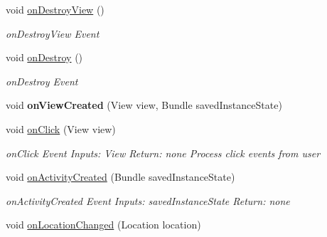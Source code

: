 \begin{DoxyCompactItemize}
void \hyperlink{classedu_1_1tamu_1_1rfsignalmap_1_1_main_activity_fragment_a8fc6bd0e569bf3c9a160a22a00d6eb06}{on\+Destroy\+View} ()
\begin{DoxyCompactList}\small\item\em on\+Destroy\+View Event \end{DoxyCompactList}\item 
void \hyperlink{classedu_1_1tamu_1_1rfsignalmap_1_1_main_activity_fragment_ac3f59b7c8c8f3f7547d7d7d1076a75ff}{on\+Destroy} ()
\begin{DoxyCompactList}\small\item\em on\+Destroy Event \end{DoxyCompactList}\item 
void {\bfseries on\+View\+Created} (View view, Bundle saved\+Instance\+State)\hypertarget{classedu_1_1tamu_1_1rfsignalmap_1_1_main_activity_fragment_acffa94c825f2858ede8ea7dd31f3c60e}{}\label{classedu_1_1tamu_1_1rfsignalmap_1_1_main_activity_fragment_acffa94c825f2858ede8ea7dd31f3c60e}

\item 
void \hyperlink{classedu_1_1tamu_1_1rfsignalmap_1_1_main_activity_fragment_a8f2690a0c6e5705769ec4e0534002db5}{on\+Click} (View view)
\begin{DoxyCompactList}\small\item\em on\+Click Event Inputs\+: View Return\+: none Process click events from user \end{DoxyCompactList}\item 
void \hyperlink{classedu_1_1tamu_1_1rfsignalmap_1_1_main_activity_fragment_ab5904b89f6ba8e6b97b513cb17be5194}{on\+Activity\+Created} (Bundle saved\+Instance\+State)\hypertarget{classedu_1_1tamu_1_1rfsignalmap_1_1_main_activity_fragment_ab5904b89f6ba8e6b97b513cb17be5194}{}\label{classedu_1_1tamu_1_1rfsignalmap_1_1_main_activity_fragment_ab5904b89f6ba8e6b97b513cb17be5194}

\begin{DoxyCompactList}\small\item\em on\+Activity\+Created Event Inputs\+: saved\+Instance\+State Return\+: none \end{DoxyCompactList}\item 
void \hyperlink{classedu_1_1tamu_1_1rfsignalmap_1_1_main_activity_fragment_ace61e3e005778db540243ef33e1238e0}{on\+Location\+Changed} (Location location)\hypertarget{classedu_1_1tamu_1_1rfsignalmap_1_1_main_activity_fragment_ace61e3e005778db540243ef33e1238e0}{}\label{classedu_1_1tamu_1_1rfsignalmap_1_1_main_activity_fragment_ace61e3e005778db540243ef33e1238e0}


\end{DoxyCompactItemize}
